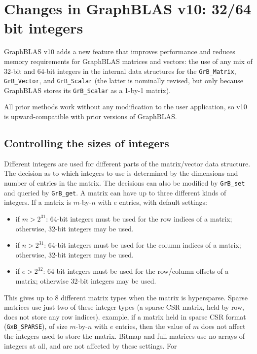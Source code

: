 
\newpage
\section{Changes in GraphBLAS v10: 32/64 bit integers}

GraphBLAS v10 adds a new feature that improves performance and reduces memory
requirements for GraphBLAS matrices and vectors:  the use of any mix of 32-bit
and 64-bit integers in the internal data structures for the \verb'GrB_Matrix',
\verb'GrB_Vector', and \verb'GrB_Scalar' (the latter is nominally revised, but
only because GraphBLAS stores its \verb'GrB_Scalar' as a 1-by-1 matrix).

All prior methods work without any modification to the user application,
so v10 is upward-compatible with prior versions of GraphBLAS.

\subsection{Controlling the sizes of integers}

Different integers are used for different parts of the matrix/vector data
structure.  The decision as to which integers to use is determined by the
dimensions and number of entries in the matrix.  The decisions can also be
modified by \verb'GrB_set' and queried by \verb'GrB_get'.  A matrix can have up
to three different kinds of integers.  If a matrix is $m$-by-$n$ with $e$
entries, with default settings:

\begin{itemize}
\item if $m > 2^{31}$: 64-bit integers must be used for the row indices of a
matrix; otherwise, 32-bit integers may be used.
\item if $n > 2^{31}$: 64-bit integers must be used for the column indices of a
matrix; otherwise, 32-bit integers may be used.
\item if $e > 2^{32}$: 64-bit integers must be used for the row/column offsets of
a matrix; otherwise 32-bit integers may be used.
\end{itemize}

This gives up to 8 different matrix types when the matrix is hypersparse.
Sparse matrices use just two of these integer types (a sparse CSR matrix, held
by row, does not store any row indices).  example, if a matrix held in sparse
CSR format (\verb'GxB_SPARSE'), of size $m$-by-$n$ with $e$ entries, then the
value of $m$ does not affect the integers used to store the matrix.  Bitmap and
full matrices use no arrays of integers at all, and are not affected by these
settings.  For


